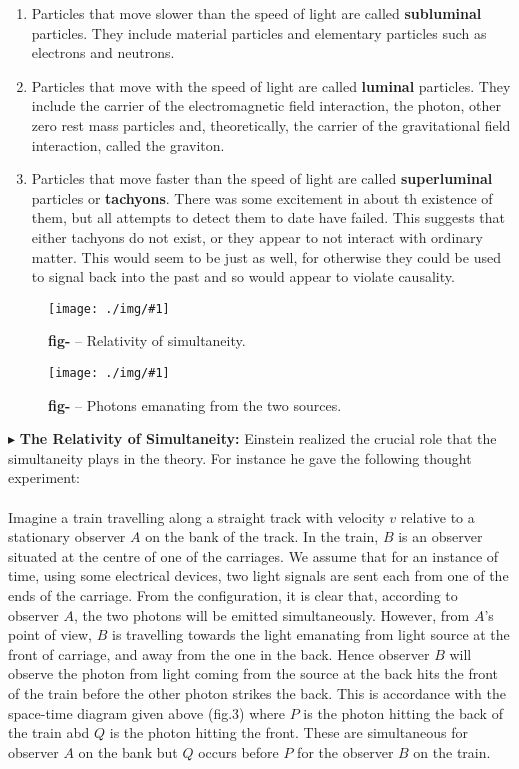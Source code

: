 \documentclass[10pt,a4paper,twocolumn]{article}
\newcounter{theo}
\newcounter{figurecounter}
\newcommand{\img}[3]{
    \begin{figure}[h!]
        \centering
        \captionsetup{justification=centering,margin=0cm,labelformat=empty}
        \texttt{[image: ./img/\#1]}
        \label{figure}
        \caption{\small\textbf{fig-\thefigurecounter} -- \textcolor{darkliver}{#3}}
    \end{figure}
    \addtocounter{figurecounter}{1}}
\newcommand{\newpoint}[1]{\indent$\blacktriangleright$ \textbf{#1}}
\begin{document}
                \begin{enumerate}
                \item Particles that move slower than the speed of light are called \textbf{subluminal} particles. They include material particles and elementary particles such as electrons and neutrons.
                \item Particles that move with the speed of light are called \textbf{luminal} particles. They include the carrier of the electromagnetic field interaction, the photon, other zero rest mass particles and, theoretically, the carrier of the gravitational field interaction, called the graviton.
                \item Particles that move faster than the speed of light are called \textbf{superluminal} particles or \textbf{tachyons}. There was some excitement in about th existence of them, but all attempts to detect them to date have failed. This suggests that either tachyons do not exist, or they appear to not interact with ordinary matter. This would seem to be just as well, for otherwise  they could be used to signal back into the past and so would appear to violate causality.
                \end{enumerate}
                \img{worldlinesimu}{0.5}{Relativity of simultaneity.}
                \img{figthreetrainexp}{0.8}{Photons emanating from the two sources.}
                \newpoint{The Relativity of Simultaneity: } Einstein realized the crucial role that the simultaneity plays in the theory. For instance he gave the following thought experiment:
                \\
                \\
                \indent Imagine a train travelling along a straight track with velocity $v$ relative to a stationary observer $A$ on the bank of the track. In the train, $B$ is an observer situated at the centre of one of the carriages. We assume that for an instance of time, using some electrical devices, two light signals are sent each from one of the ends of the carriage. From the configuration, it is clear that, according to observer $A$, the two  photons will be emitted simultaneously. However, from $A$'s point of view, $B$ is travelling towards the light emanating from light source at the front of carriage, and away from the one in the back. Hence observer $B$ will observe the photon from light coming from the source at the back hits the front of the train before the other photon strikes the back. This is accordance with the space-time diagram given above (fig.3) where $P$ is the photon hitting the back of the train abd $Q$ is the photon hitting the front. These are simultaneous for observer $A$ on the bank but $Q$ occurs before $P$ for the observer $B$ on the train.
\end{document}
